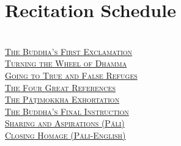 
\chapter{Recitation Schedule}
\label{schedule}

{\centering

  {\libertinusFont\selectfont\textbf{\textsc{\ifafive\fontsize{18}{12}\fi\ifninebythirteen\fontsize{13}{8.5}\fi\ifbfive\fontsize{22}{18}\fi\selectfont{}}}}\\
  \textsc{\ifafive\fontsize{14.4}{28}\fi\ifninebythirteen\fontsize{8.7}{17}\fi\ifbfive\fontsize{16}{33.5}\fi\selectfont
    \hyperref[buddhas-first-exclamation]{The Buddha's First Exclamation} \ifdigital\else\pageref{buddhas-first-exclamation}\fi\\
    \hyperref[wheel-of-dhamma-abridged]{Turning the Wheel of Dhamma} \ifdigital\else\pageref{wheel-of-dhamma-abridged}\fi\\
    \hyperref[true-false-refuges]{Going to True and False Refuges} \ifdigital\else\pageref{true-false-refuges}\fi\\
    \hyperref[four-great-references]{The Four Great References} \ifdigital\else\pageref{four-great-references}\fi\\
    \hyperref[patimokkha-exhortation]{The Pāṭimokkha Exhortation} \ifdigital\else\pageref{patimokkha-exhortation}\fi\\
    \hyperref[buddhas-final-instruction]{The Buddha's Final Instruction} \ifdigital\else\pageref{buddhas-final-instruction}\fi\\
    \hyperref[uddissanadhitthana]{Sharing and Aspirations (Pāli)} \ifdigital\else\pageref{uddissanadhitthana}\fi\\
    \hyperref[closing-homage]{Closing Homage (Pāli-English)} \ifdigital\else\pageref{closing-homage}\fi\\
  }

  \ifafive\vspace{1.0cm}\fi
  \ifninebythirteen\vspace{0.8cm}\fi
  \ifbfive\vspace{1.0cm}\fi

}
